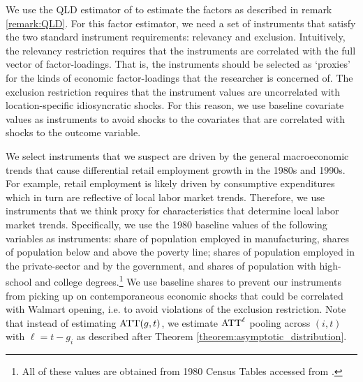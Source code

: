 \documentclass[12pt]{article}
\begin{document}
We use the QLD estimator of \citet{Ahn_Lee_Schmidt_2013} to estimate the factors as described in remark \ref{remark:QLD}. For this factor estimator, we need a set of instruments that satisfy the two standard instrument requirements: relevancy and exclusion. Intuitively, the relevancy restriction requires that the instruments are correlated with the full vector of factor-loadings. That is, the instruments should be selected as `proxies' for the kinds of economic factor-loadings that the researcher is concerned of. The exclusion restriction requires that the instrument values are uncorrelated with location-specific idiosyncratic shocks. For this reason, we use baseline covariate values as instruments to avoid shocks to the covariates that are correlated with shocks to the outcome variable. 

We select instruments that we suspect are driven by the general macroeconomic trends that cause differential retail employment growth in the 1980s and 1990s. For example, retail employment is likely driven by consumptive expenditures which in turn are reflective of local labor market trends. Therefore, we use instruments that we think proxy for characteristics that determine local labor market trends. Specifically, we use the 1980 baseline values of the following variables as instruments: share of population employed in manufacturing, shares of population below and above the poverty line; shares of population employed in the private-sector and by the government, and shares of population with high-school and college degrees.\footnote{All of these values are obtained from 1980 Census Tables accessed from \citet{manson2020ipums}.} We use baseline shares to prevent our instruments from picking up on contemporaneous economic shocks that could be correlated with Walmart opening, i.e. to avoid violations of the exclusion restriction. Note that instead of estimating $\text{ATT}(g,t)$, we estimate $\text{ATT}^\ell$ pooling across $(i, t)$ with $\ell = t - g_i$ as described after Theorem \ref{theorem:asymptotic_distribution}.
\end{document}
